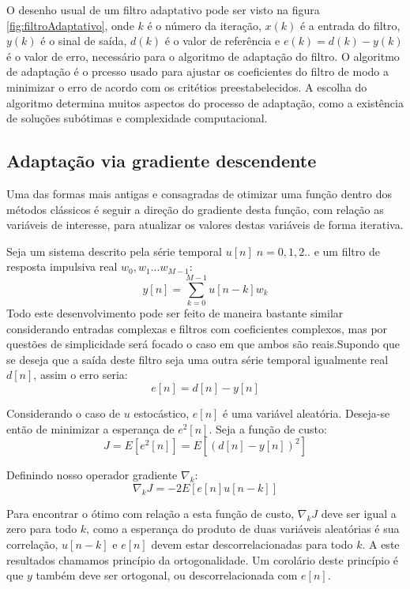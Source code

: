 \indent O desenho usual de um filtro adaptativo pode ser visto na figura \ref{fig:filtroAdaptativo}, onde $k$ é o número da iteração, $x(k)$ é a entrada do filtro, $y(k)$ é o sinal de saída, $d(k)$ é o valor de referência e $e(k)=d(k)-y(k)$ é o valor de erro, necessário para o algoritmo de adaptação do filtro. O algoritmo de adaptação é o prcesso usado para ajustar os coeficientes do filtro de modo a minimizar o erro de acordo com os critétios preestabelecidos. A escolha do algoritmo determina muitos aspectos do processo de adaptação, como a existência de soluções subótimas e complexidade computacional.

\subsection{Adaptação via gradiente descendente}

Uma das formas mais antigas e consagradas de otimizar uma função dentro dos métodos clássicos é seguir a direção do gradiente desta função, com relação as variáveis de interesse, para atualizar os valores destas variáveis de forma iterativa.

Seja um sistema descrito pela série temporal $u[n] \; n=0,1,2..$ e um filtro de resposta impulsiva real $w_0, w_1 ... w_{M-1}$:
\begin{equation}
y[n]=\sum_{k=0}^{M-1}u[n-k]w_k
\end{equation}
Todo este desenvolvimento pode ser feito de maneira bastante similar considerando entradas complexas e filtros com coeficientes complexos, mas por questões de simplicidade será focado o caso em que ambos são reais.Supondo que se deseja que a saída deste filtro seja uma outra série temporal igualmente real $d[n]$, assim o erro seria:
\begin{equation}
e[n]=d[n]-y[n]    
\end{equation}

Considerando o caso de $u$ estocástico, $e[n]$ é uma variável aleatória. Deseja-se então de minimizar a esperança de $e^2[n]$. Seja a função de custo:
\begin{equation}
J=E[e^2[n]]=E[(d[n]-y[n])^2]   
\end{equation}

Definindo nosso operador gradiente $\nabla_k$:
\begin{equation}
\nabla_k J=-2 E[e[n]u[n-k]]   
\end{equation}

Para encontrar o ótimo com relação a esta função de custo, $\nabla_k J$ deve ser igual a zero para todo $k$, como a esperança do produto de duas variáveis aleatórias é sua correlação, $u[n-k]$ e $e[n]$ devem estar descorrelacionadas para todo $k$. A este resultados chamamos princípio da ortogonalidade. Um corolário deste princípio é que $y$ também deve ser ortogonal, ou descorrelacionada com $e[n]$.

